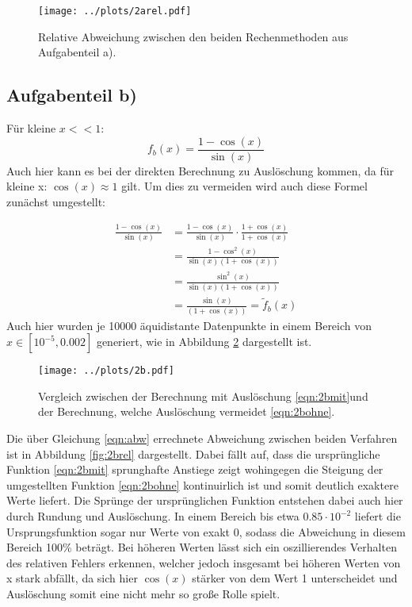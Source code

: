 \begin{figure}[H]
  \centering
  \texttt{[image: ../plots/2arel.pdf]}
  \caption{Relative Abweichung zwischen den beiden Rechenmethoden aus Aufgabenteil a).}
  \label{fig:2arel}
\end{figure}

\subsection*{Aufgabenteil b)}
Für kleine $x<<1$:
\begin{equation}
  f_b(x)=\frac{1-\cos(x)}{\sin(x)}
  \label{eqn:2bmit}
\end{equation}
Auch hier kann es bei der direkten Berechnung zu Auslöschung kommen, da für kleine x: $\cos(x)\approx 1$ gilt.
Um dies zu vermeiden wird auch diese Formel zunächst umgestellt:

\begin{align}
  \frac{1-\cos(x)}{\sin(x)} &= \frac{1-\cos(x)}{\sin(x)}\cdot \frac{1+\cos(x)}{1+\cos(x)}\\
  &=\frac{1-\cos^2(x)}{\sin(x)(1+\cos(x))} \\
  &=\frac{\sin^2(x)}{\sin(x)(1+\cos(x))} \\
  &=\frac{\sin(x)}{(1+\cos(x))} =\tilde{f}_b(x)
  \label{eqn:2bohne}
\end{align}
Auch hier wurden je 10000 äquidistante
Datenpunkte in einem Bereich von $x\in[10^{-5},0.002]$ generiert, wie in Abbildung \ref{fig:2b} dargestellt ist.

\begin{figure}[H]
  \centering
  \texttt{[image: ../plots/2b.pdf]}
  \caption{Vergleich zwischen der Berechnung mit Auslöschung \eqref{eqn:2bmit}und der Berechnung, welche Auslöschung vermeidet \eqref{eqn:2bohne}.}
  \label{fig:2b}
\end{figure}

Die über Gleichung \eqref{eqn:abw} errechnete Abweichung zwischen beiden Verfahren ist in Abbildung \ref{fig:2brel} dargestellt. Dabei fällt auf, dass die ursprüngliche Funktion \eqref{eqn:2bmit} sprunghafte Anstiege zeigt wohingegen die Steigung der umgestellten Funktion \eqref{eqn:2bohne} kontinuirlich ist und somit
deutlich exaktere Werte liefert. Die Sprünge der ursprünglichen Funktion entstehen dabei auch hier durch Rundung und Auslöschung. In einem Bereich bis etwa $0.85\cdot10^{-2}$ liefert die Ursprungsfunktion sogar nur Werte von exakt 0, sodass die Abweichung in diesem Bereich 100\% beträgt. Bei höheren Werten lässt sich ein oszillierendes
Verhalten des relativen Fehlers erkennen, welcher jedoch insgesamt bei höheren Werten von x stark abfällt, da sich hier $\cos(x)$ stärker von dem Wert 1 unterscheidet und Auslöschung somit eine nicht mehr so große Rolle spielt.


